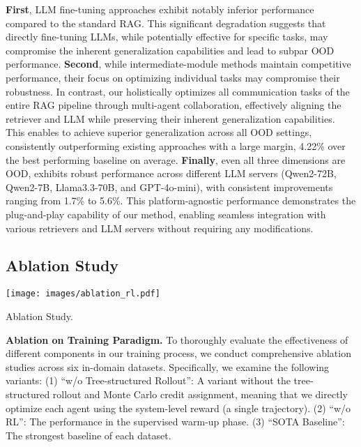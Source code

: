 \textbf{First}, LLM fine-tuning approaches exhibit notably inferior performance compared to the standard RAG. This significant degradation suggests that directly fine-tuning LLMs, while potentially effective for specific tasks, may compromise the inherent generalization capabilities and lead to subpar OOD performance.
\textbf{Second}, while intermediate-module methods maintain competitive performance, their focus on optimizing individual tasks may compromise their robustness.
In contrast, our \modelname holistically optimizes all communication tasks of the entire RAG pipeline through multi-agent collaboration, effectively aligning the retriever and LLM while preserving their inherent generalization capabilities.
This enables \modelname to achieve superior generalization across all OOD settings, consistently outperforming existing approaches with a large margin, 4.22\% over the best performing baseline on average.
\textbf{Finally}, even all three dimensions are OOD, \modelname exhibits robust performance across different LLM servers (Qwen2-72B, Qwen2-7B, Llama3.3-70B, and GPT-4o-mini), with consistent improvements ranging from 1.7\% to 5.6\%.
This platform-agnostic performance demonstrates the plug-and-play capability of our method, enabling seamless integration with various retrievers and LLM servers without requiring any modifications.


\subsection{Ablation Study}
\begin{wraptable}{r}{8cm}
\vspace{-4em}
    \begin{center}
    \texttt{[image: images/ablation\_rl.pdf]}
    \caption{Ablation Study.}
    \vspace{-2em}
    \label{fig:ablation_rl}
    \end{center}
\end{wraptable}

\textbf{Ablation on Training Paradigm.}
To thoroughly evaluate the effectiveness of different components in our training process, we conduct comprehensive ablation studies across six in-domain datasets. Specifically, we examine the following variants:
(1) ``w/o Tree-structured Rollout'': A variant without the tree-structured rollout and Monte Carlo credit assignment, meaning that we directly optimize each agent using the system-level reward (a single trajectory).
(2) ``w/o RL'': The performance in the supervised warm-up phase.
(3) ``SOTA Baseline'': The strongest baseline of each dataset.

